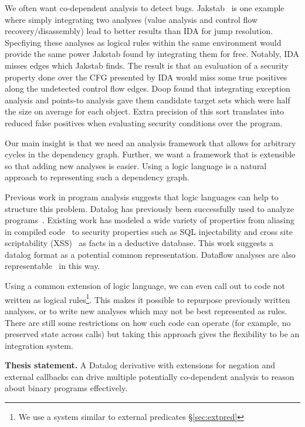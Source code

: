 We often want co-dependent analysis to detect bugs.
Jakstab~\cite{jakstab} is one example where simply integrating two analyses (value analysis and control flow recovery/disassembly) lead to better results than IDA\cite{ida} for jump resolution.
Specfiying these analyses as logical rules within the same environment would provide the same power Jakstab found by integrating them for free.
Notably, IDA misses edges which Jakstab finds.
The result is that an evaluation of a security property done over the CFG presented by IDA would miss some true positives along the undetected control flow edges.
Doop\cite{doop1} found that integrating exception analysis and points-to analysis gave them candidate target sets which were half the size on average for each object.
Extra precision of this sort translates into reduced false positives when evaluating security conditions over the program.

Our main insight is that we need an analysis framework that allows for arbitrary cycles in the dependency graph.
Further, we want a framework that is extensible so that adding new analyses is easier.
Using a logic language is a natural approach to representing such a dependency graph.

Previous work in program analysis suggests that logic languages can help to structure this problem.
Datalog has previously been successfully used to analyze programs~\cite{lam2005,brumley2006,alpuente2011,doop1,bddbddb}.
Existing work has modeled a wide variety of properties from aliasing in compiled code~\cite{brumley2006} to security properties such as SQL injectability and cross site scriptability (XSS)~\cite{lam2005} as facts in a deductive database.
This work suggests a datalog format as a potential common representation.
Dataflow analyses are also representable~\cite{mcallester2002} in this way.

Using a common extension of logic language, we can even call out to code not written as logical rules\footnote{We use a system similar to external predicates \S\ref{sec:extpred}}.
This makes it possible to repurpose previously written analyses, or to write new analyses which may not be best represented as rules.
There are still some restrictions on how such code can operate (for example, no preserved state across calls) but taking this approach gives the flexibility to be an integration system.

\begin{inset}
{\bf Thesis statement.}
A Datalog derivative with extensions for negation and external callbacks can drive multiple potentially co-dependent analysis to reason about binary programs effectively.
\end{inset}

